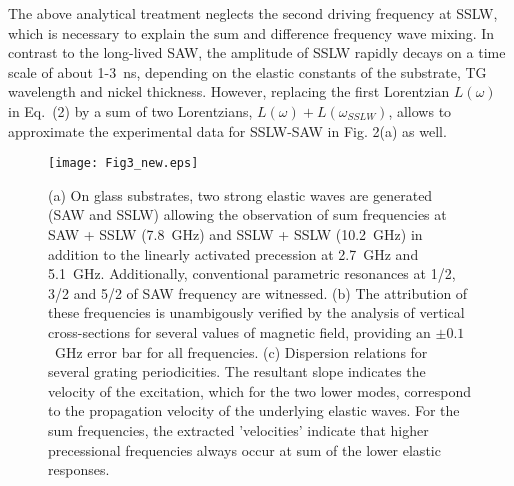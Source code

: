 \documentclass[aps,showpacs,prb,twocolumn,superscriptaddress]{revtex4}
\begin{document}
The above analytical treatment neglects the second driving frequency at SSLW, which is necessary to explain the sum and difference frequency wave mixing. In contrast to the long-lived SAW, the amplitude of SSLW rapidly decays on a time scale of about 1-3~ns, depending on the elastic constants of the substrate, TG wavelength and nickel thickness.  However, replacing the first Lorentzian $L(\omega)$ in Eq.~(2) by a sum of two Lorentzians, $L(\omega)+L(\omega_{SSLW})$, allows to approximate the experimental data for SSLW-SAW in Fig. 2(a) as well. 

\begin{figure}[ht]
    \texttt{[image: Fig3\_new.eps]}
    \caption{(a) On glass substrates, two strong elastic waves are generated (SAW and SSLW) allowing the observation of sum frequencies at SAW + SSLW (7.8~GHz) and SSLW + SSLW (10.2~GHz) in addition to the linearly activated precession at 2.7~GHz and 5.1~GHz.  Additionally, conventional parametric resonances at 1/2, 3/2 and 5/2 of SAW frequency are witnessed. (b) The attribution of these frequencies is unambigously verified by the analysis of vertical cross-sections for several values of magnetic field, providing an $\pm 0.1$~GHz error bar for all frequencies.
    (c) Dispersion relations for several grating periodicities.  The resultant slope indicates the velocity of the excitation, which for the two lower modes, correspond to the propagation velocity of the underlying elastic waves.  For the sum frequencies, the extracted 'velocities' indicate that higher precessional frequencies always occur at sum of the lower elastic responses.}
   \label{dispersion}
\end{figure}
\end{document}
